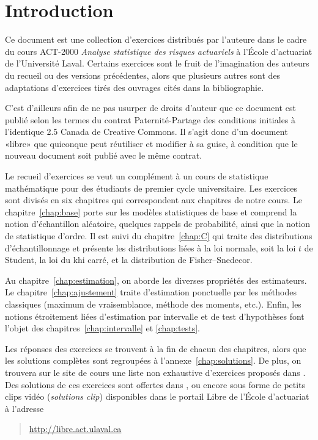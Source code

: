 \chapter*{Introduction}

Ce document est une collection d'exercices distribués par l'auteure dans le cadre du cours ACT-2000 \emph{Analyse statistique des risques
actuariels} à l'École d'actuariat de l'Université Laval. Certains
exercices sont le fruit de l'imagination des auteurs du recueil ou des versions précédentes, alors que
plusieurs autres sont des adaptations d'exercices tirés des ouvrages
cités dans la bibliographie.

C'est d'ailleurs afin de ne pas usurper de droits d'auteur que ce
document est publié selon les termes du contrat Paternité-Partage des
conditions initiales à l'identique 2.5 Canada de Creative Commons. Il
s'agit donc d'un document «libre» que quiconque peut réutiliser et
modifier à sa guise, à condition que le nouveau document soit publié
avec le même contrat.

Le recueil d'exercices se veut un complément à un cours de statistique
mathématique pour des étudiants de premier cycle
universitaire. Les exercices sont divisés en six chapitres qui
correspondent aux chapitres de notre cours. Le
chapitre~\ref{chap:base} porte sur les modèles statistiques de base et comprend la notion
d'échantillon aléatoire, quelques rappels de probabilité, ainsi que la notion de statistique d'ordre.
Il est suivi du chapitre~\ref{chap:C} qui traite des distributions d'échantillonnage et présente les
distributions liées à la loi normale, soit la loi $t$ de Student, la loi du khi carré, et la distribution de Fisher--Snedecor. 

Au chapitre~\ref{chap:estimation}, on aborde les diverses propriétés des estimateurs.
Le chapitre~\ref{chap:ajustement} traite d'estimation ponctuelle par
les méthodes classiques (maximum de vraisemblance, méthode des
moments, etc.). Enfin, les notions étroitement liées d'estimation par intervalle et 
de test d'hypothèses font l'objet des chapitres~\ref{chap:intervalle} et \ref{chap:tests}.

Les réponses des exercices se trouvent à la fin de chacun des
chapitres, alors que les solutions complètes sont regroupées à
l'annexe~\ref{chap:solutions}. De plus, on trouvera sur le site de cours
 une liste non exhaustive d'exercices proposés dans
\cite{Wackerly:mathstat:7e:2008}. Des solutions de ces exercices
sont offertes dans \cite{Wackerly:solutions:7e:2008}, ou encore sous
forme de petits clips vidéo (\emph{solutions clip}) disponibles dans le
portail Libre de l'École d'actuariat à l'adresse
\begin{quote}
  \url{http://libre.act.ulaval.ca}
\end{quote}


